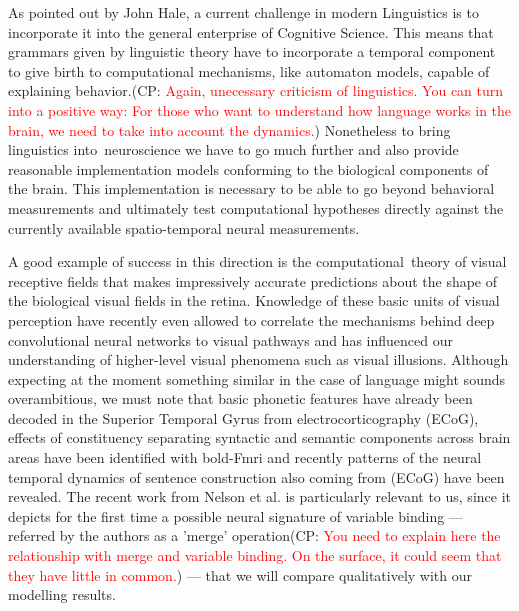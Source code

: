 \documentclass[10pt]{article}
\newcommand{\noteCP}[1]{(CP: \textcolor{red}{#1})}
\begin{document}
{\label{619233}}

As pointed out by John Hale\cite{hale2014automaton}, a current
challenge in modern Linguistics is to incorporate it into the general
enterprise of Cognitive Science. This means that grammars given by
linguistic theory have to incorporate a temporal component to give
birth to computational mechanisms, like automaton models, capable of
explaining behavior.\noteCP{Again, unecessary criticism of
  linguistics. You can turn into a positive way: For those who want to
  understand how language works in the brain, we need to take into
  account the dynamics.} Nonetheless to bring linguistics
into~neuroscience we have to go much further and also provide
reasonable implementation models conforming to the biological
components of the brain. This implementation is necessary to be able
to go beyond behavioral measurements and ultimately test computational
hypotheses directly against the currently available spatio-temporal
neural measurements.

A good example of success in this direction is the
computational~theory of visual receptive
fields\cite{lindeberg2017normative} that makes impressively accurate
predictions about the shape of the biological visual fields in the
retina. Knowledge of these basic units of visual perception have
recently even allowed to correlate the mechanisms behind deep
convolutional neural networks to visual
pathways\cite{Guclu_2015,Eickenberg_2017} and has influenced our
understanding of higher-level visual phenomena such as visual
illusions\cite{Eagleman_2001}. Although expecting at the moment
something similar in the case of language might sounds overambitious,
we must note that basic phonetic features have already been decoded in
the Superior Temporal Gyrus from electrocorticography
(ECoG)\cite{Mesgarani_2014}, effects of constituency separating
syntactic and semantic components across brain areas have been
identified with bold-Fmri\cite{Pallier_2011} and recently patterns of
the neural temporal dynamics of sentence construction also coming from
(ECoG) have been revealed\cite{Fedorenko_2016,Nelson_2017}. The recent
work from Nelson et al.\cite{Nelson_2017} is particularly relevant to
us, since it depicts for the first time a possible neural signature of
variable binding --- referred by the authors as a 'merge'
operation\noteCP{You need to explain here the relationship with merge
  and variable binding. On the surface, it could seem that they have
  little in common.} --- that we will compare qualitatively with our
modelling results.
\end{document}
